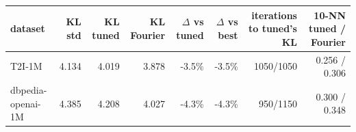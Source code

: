 \begin{tabular}{lrrrrrrr}\toprule
dataset & KL std & KL tuned & KL Fourier & $\Delta$ vs tuned & $\Delta$ vs best & iterations to tuned's KL & 10-NN tuned / Fourier\\\midrule
T2I-1M & 4.134 & 4.019 & 3.878 & -3.5\% & -3.5\% & 1050/1050 & 0.256 / 0.306\\
dbpedia-openai-1M & 4.385 & 4.208 & 4.027 & -4.3\% & -4.3\% & 950/1150 & 0.300 / 0.348\\
\bottomrule\end{tabular}

